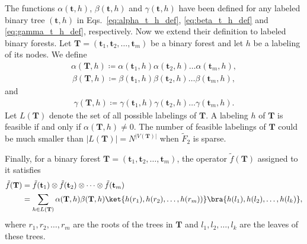 \documentclass[superscriptaddress,onecolumn,nofootinbib,longbibliography,a4paper,accepted=2026-09-29]{quantumarticle}
\theoremstyle{plain}
\theoremstyle{definition}
\numberwithin{thm}{section}
\numberwithin{assumption}{section}
\numberwithin{lemma}{section}
\numberwithin{prop}{section}
\numberwithin{cor}{section}
\numberwithin{definition}{section}
\numberwithin{rmk}{section}
\numberwithin{equation}{section}
\newcommand{\defeq}{\coloneqq}
\newcommand{\mbt}{\mathbf{t}}
\newcommand{\mbf}{\mathbf{T}}
\begin{document}
The functions $\alpha(\mbt, h)$, $\beta(\mbt, h)$ and $\gamma(\mbt, h)$ have been defined for any labeled binary tree $(\mbt, h)$ in  Eqs.~\eqref{eq:alpha_t_h_def}, \eqref{eq:beta_t_h_def} and \eqref{eq:gamma_t_h_def}, respectively. Now we extend their definition to labeled binary forests. Let $\mbf=(\mbt_1,\mbt_2,\dots,\mbt_m)$ be a binary forest and let $h$ be a labeling of its nodes. We define
\begin{align}
    \alpha(\mbf, h) \defeq \alpha(\mbt_1, h)\alpha(\mbt_2, h) \dots 
    \alpha(\mbt_m, h),
\end{align}
\begin{align}
    \beta(\mbf, h) \defeq \beta(\mbt_1, h)\beta(\mbt_2, h) \dots 
    \beta(\mbt_m, h),
\end{align}
and
\begin{align}
    \gamma(\mbf, h) \defeq \gamma(\mbt_1, h)\gamma(\mbt_2, h) \dots 
    \gamma(\mbt_m, h).
\end{align}
Let $L(\mbf)$ denote the set of all possible labelings of $\mbf$. A labeling $h$ of $\mbf$ is feasible if and only if $\alpha(\mbf, h) \neq 0$. The number of feasible labelings of $\mbf$ could be much smaller than $|L(\mbf)|=N^{|V(\mbf)|}$ when $\tilde{F}_2$ is sparse.

Finally, for a binary forest $\mbf=(\mbt_1,\mbt_2,\dots,\mbt_m)$, the operator $\tilde{f}(\mbf)$ assigned to it satisfies
\begin{align}
    \tilde{f}(\mbf)&=\tilde{f}(\mbt_1) \otimes \tilde{f}(\mbt_2) \otimes \dots \otimes \tilde{f}(\mbt_m) \\
    &=\sum_{h \in L(\mbf)} \alpha(\mbf, h) \beta(\mbf, h) \ket{h(r_1),h(r_2),\dots,h(r_m))}\bra{h(l_1), h(l_2),\dots, h(l_k)},
\end{align}
where $r_1,r_2,\dots,r_m$ are the roots of the trees in $\mbf$ and $l_1,l_2,\dots,l_k$ are the leaves of these trees.
\end{document}
